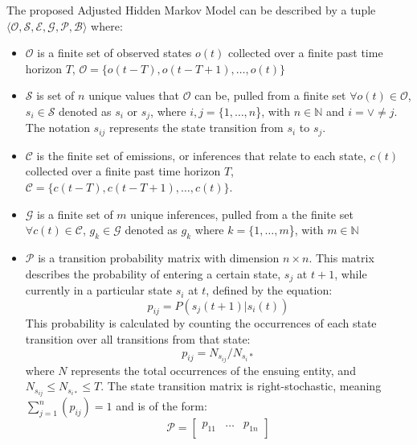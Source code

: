 \documentclass[letterpaper, 10 pt, conference]{ieeeconf}  %
\newcommand\NB[1]{$\spadesuit$\footnote{NB: #1}}
\begin{document}
The proposed Adjusted Hidden Markov Model can be described by a tuple $\langle \mathcal{O},\mathcal{S},\mathcal{E},\mathcal{G},\mathcal{P},\mathcal{B} \rangle$  where:
\begin{itemize}
    \item $\mathcal{O}$ is a finite set of observed states $o(t)$ collected over a finite past time horizon $T$, $\mathcal{O} = \{ o(t-T), o(t-T+1), \ldots, o(t)\}$
    \item  $\mathcal{S}$ is set of $n$ unique values that $\mathcal{O}$ can be, pulled from a finite set $\forall o(t)\in\mathcal{O}$, $s_i \in \mathcal{S}$ denoted as $s_{i}$ or $s_{j}$, where $i,j = \{1,\ldots,n$\}, with $n \in \mathbb{N}$ and $i = \lor \neq j$. The notation $s_{ij}$ represents the state transition from $s_i$ to $s_j$.
    \item $\mathcal{C}$ is the finite set of emissions, or inferences that relate to each state, $c(t)$ collected over a finite past time horizon $T$, $\mathcal{C} = \{ c(t-T), c(t-T+1), \ldots, c(t)\}$.  
    \item $\mathcal{G}$ is a finite set of $m$ unique inferences, pulled from a the finite set $\forall c(t)\in\mathcal{C}$, $g_k \in \mathcal{G}$ denoted as $g_{k}$ where $k = \{1,\ldots,m$\}, with $m \in \mathbb{N}$
    \item $\mathcal{P}$ is a transition probability matrix with dimension $n \times n$. This matrix describes the probability of entering a certain state, $s_{j}$ at $t+1$, while currently in a particular state $s_{i}$ at $t$, defined by the equation:
        \begin{equation}
            p_{ij} = P(s_j(t+1) \vert s_i(t))
        \end{equation}
        This probability is calculated by counting the occurrences of each state transition over all transitions from that state:
        \begin{equation} \label{eq:transbuild}
            p_{ij} = N_{s_{ij}}/N_{s_{i}*}
        \end{equation}
        where $N$ represents the total occurrences of the ensuing entity, and $N_{s_{ij}} \leq N_{s_{i*}} \leq T$. The state transition matrix is right-stochastic, meaning $\sum_{j=1}^{n}(p_{ij}) = 1$ and is of the form:
        \begin{equation}
            \mathcal{P} = 
                    \begin{bmatrix}
                        p_{11} & \dots & p_{1n} \\

\end{bmatrix}
\end{equation}
\end{itemize}
\end{document}

